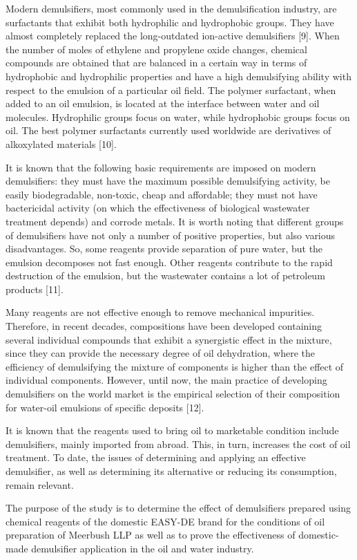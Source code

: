 \begin{multicols}{2}
Modern demulsifiers, most commonly used in the demulsification industry,
are surfactants that exhibit both hydrophilic and hydrophobic groups.
They have almost completely replaced the long-outdated ion-active
demulsifiers {[}9{]}. When the number of moles of ethylene and propylene
oxide changes, chemical compounds are obtained that are balanced in a
certain way in terms of hydrophobic and hydrophilic properties and have
a high demulsifying ability with respect to the emulsion of a particular
oil field. The polymer surfactant, when added to an oil emulsion, is
located at the interface between water and oil molecules. Hydrophilic
groups focus on water, while hydrophobic groups focus on oil. The best
polymer surfactants currently used worldwide are derivatives of
alkoxylated materials {[}10{]}.

It is known that the following basic requirements are imposed on modern
demulsifiers: they must have the maximum possible demulsifying activity,
be easily biodegradable, non-toxic, cheap and affordable; they must not
have bactericidal activity (on which the effectiveness of biological
wastewater treatment depends) and corrode metals. It is worth noting
that different groups of demulsifiers have not only a number of positive
properties, but also various disadvantages. So, some reagents provide
separation of pure water, but the emulsion decomposes not fast enough.
Other reagents contribute to the rapid destruction of the emulsion, but
the wastewater contains a lot of petroleum products {[}11{]}.

Many reagents are not effective enough to remove mechanical impurities.
Therefore, in recent decades, compositions have been developed
containing several individual compounds that exhibit a synergistic
effect in the mixture, since they can provide the necessary degree of
oil dehydration, where the efficiency of demulsifying the mixture of
components is higher than the effect of individual components. However,
until now, the main practice of developing demulsifiers on the world
market is the empirical selection of their composition for water-oil
emulsions of specific deposits {[}12{]}.

It is known that the reagents used to bring oil to marketable condition
include demulsifiers, mainly imported from abroad. This, in turn,
increases the cost of oil treatment. To date, the issues of determining
and applying an effective demulsifier, as well as determining its
alternative or reducing its consumption, remain relevant.

The purpose of the study is to determine the effect of demulsifiers
prepared using chemical reagents of the domestic EASY-DE brand for the
conditions of oil preparation of Meerbush LLP as well as to prove the
effectiveness of domestic-made demulsifier application in the oil and
water industry.


\end{multicols}
